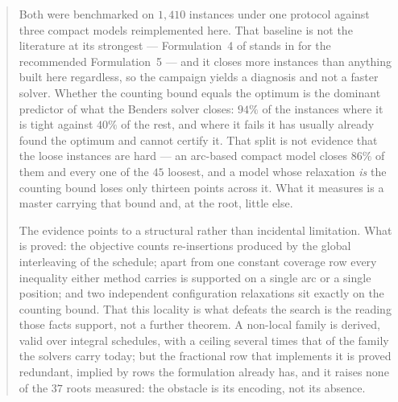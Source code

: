 \begin{abstract}
Both were benchmarked on $1{,}410$ instances under one protocol against three compact
models reimplemented here. That baseline is not the literature at its strongest ---
Formulation~4 of \citet{Catanzaro2015} stands in for the recommended Formulation~5 ---
and it closes more instances than anything built here regardless, so the
campaign yields a diagnosis and not a faster solver. Whether the counting bound equals
the optimum is the dominant predictor of what the Benders solver closes: $94\%$ of the
instances where it is tight against $40\%$ of the rest, and where it fails it has
usually already found the optimum and cannot certify it. That split is not evidence that
the loose instances are hard --- an arc-based compact model closes $86\%$ of them and
every one of the $45$ loosest,
and a model whose relaxation \emph{is} the counting bound loses only thirteen points
across it. What it measures is a master carrying that bound and, at the root, little
else.

The evidence points to a structural rather than incidental limitation. What is proved:
the objective counts re-insertions produced by the global interleaving of the schedule;
apart from one constant coverage row every inequality either method carries is supported
on a single arc or a single position; and two independent configuration relaxations sit
exactly on the counting bound. That this locality is what defeats the search is the
reading those facts support, not a further theorem. A non-local family is derived, valid over
integral schedules, with a ceiling several times that of the family the solvers carry
today; but the fractional row that implements it is proved redundant, implied by
rows the formulation already has, and it raises none of the $37$ roots measured: the
obstacle is its encoding, not its absence.
\end{abstract}
